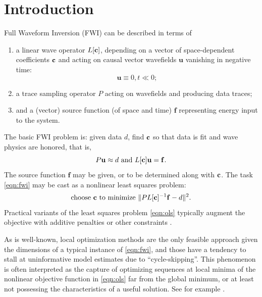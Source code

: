 \documentclass[georeport,12pt]{geophysics}
\newcommand{\bff}{\mathbf{f}}
\newcommand{\bu}{\mathbf{u}}
\begin{document}
\section{Introduction}
Full Waveform Inversion (FWI) can be described in terms of 
\begin{enumerate}
\item a linear wave operator $L[{\bf c}]$, depending on a vector of
  space-dependent coefficients ${\bf c}$ and acting on causal vector wavefields $\bu$ vanishing in negative time:
\begin{equation}
\label{eqn:init}
\bu \equiv 0, t \ll 0; 
\end{equation}
\item a trace sampling operator $P$ acting on wavefields and producing data traces;
\item and a (vector) source function (of space and time) $\bff$ representing energy input to the system. 
\end{enumerate}
The basic FWI problem is: given data $d$, find ${\bf c}$ so that data
is fit and wave physics are honored, that is, 
\begin{equation}
\label{eqn:fwi}
P\bu \approx d \mbox{ and } L[\bf{c}]\bu = \bff.
\end{equation}
The source function $\bff$ may be given, or to be determined along
with $\bf{c}$.
The task \ref{eqn:fwi} may be cast as a nonlinear least squares problem: 
\begin{equation}
\label{eqn:ols}
\mbox{choose } {\bf c} \mbox{ to minimize } \|PL[{\bf c}]^{-1}\bff -d \|^2.
\end{equation}
Practical variants of the least squares problem \ref{eqn:ols}
typically augment the objective with additive penalties or other
constraints \cite[]{VirieuxOperto:09,Fichtner:10,Schuster:17}. 

As is well-known, local optimization methods are the only feasible
approach given the dimensions of a typical instance of \ref{eqn:fwi},
and those have a tendency to stall at uninformative model estimates
due to ``cycle-skipping''. This phenomenon is often interpreted as the
capture of optimizing sequences at local minima of the nonlinear objective
function in \ref{eqn:ols} far from the global minimum, or at least not
possessing the characteristics of a useful solution. See for
example \cite{GauTarVir:86,VirieuxOperto:09,PladysBrossierLiMetivier:GEO21}.
\end{document}
